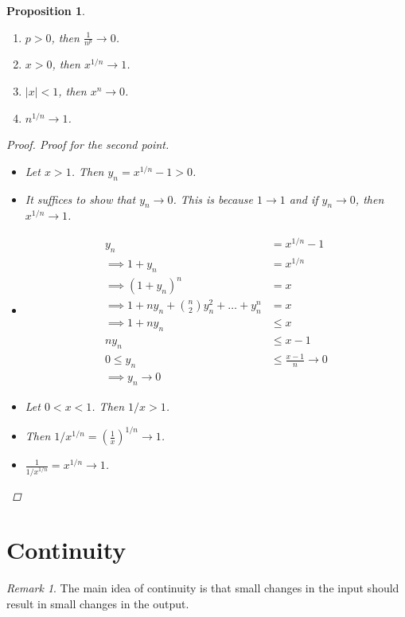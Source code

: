 \documentclass[10pt]{article}
\newtheorem{proposition}[theorem]{Proposition}
\theoremstyle{definition}
\theoremstyle{remark}
\newtheorem*{remark}{Remark}
\begin{document}
\begin{proposition}
    \hfill
    \begin{enumerate}
        \item $p > 0$, then $\frac{1}{n^p} \to 0$.
        \item $x > 0$, then $x^{1/n} \to 1$.
        \item $|x| < 1$, then $x^n \to 0$.
        \item $n^{1/n} \to 1$.
    \end{enumerate}
    \begin{proof}
        Proof for the second point.
        \begin{itemize}
            \item Let $x > 1$. Then $y_n = x^{1/n} - 1 > 0$.
            \item It suffices to show that $y_n \to 0$. This is because $1 \to 1$ and if $y_n \to 0$, then $x^{1/n} \to 1$.
            \item
                \begin{align*}
                    y_n &= x^{1/n} - 1  \\
                        \implies 1 + y_n &= x^{1/n} \\
                    \implies (1 + y_n)^n &= x \\
                    \implies 1 + ny_n + \binom{n}{2} y_n^2 + \ldots + y_n^n &= x \\
                    \implies 1 + ny_n &\leq x \\
                    n y_n &\leq x - 1 \\
                    0 \leq y_n &\leq \frac{x - 1}{n} \to 0 \\
                    \implies y_n \to 0
                \end{align*}
            \item Let $0 < x < 1$. Then $1/x > 1$.
            \item Then $1/x^{1/n} = \left(\frac{1}{x}\right)^{1/n} \to 1$.
            \item $\frac{1}{1/x^{1/n}} = x^{1/n} \to 1$.
        \end{itemize}
    \end{proof}
\end{proposition}

\newpage

\section{Continuity}
\begin{remark}
    The main idea of continuity is that small changes in the input should result in small changes in the output.
\end{remark}
\end{document}
